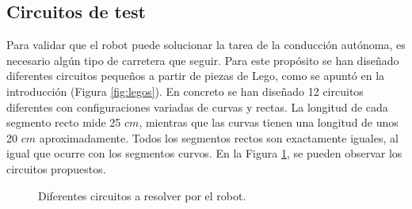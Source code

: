 \subsection{Circuitos de test}

Para validar que el robot puede solucionar la tarea de la conducción autónoma, es necesario algún tipo de carretera que seguir. Para este propósito se han diseñado diferentes circuitos pequeños a partir de piezas de Lego, como se apuntó en la introducción (Figura \ref{fig:legos}). En concreto se han diseñado 12 circuitos diferentes con configuraciones variadas de curvas y rectas. La longitud de cada segmento recto mide 25 $cm$, mientras que las curvas tienen una longitud de unos 20 $cm$ aproximadamente. Todos los segmentos rectos son exactamente iguales, al igual que ocurre con los segmentos curvos. En la Figura \ref{fig:pistas}, se pueden observar los circuitos propuestos.

\begin{figure}
  \caption{Diferentes circuitos a resolver por el robot.}
  \label{fig:pistas}
\end{figure}

